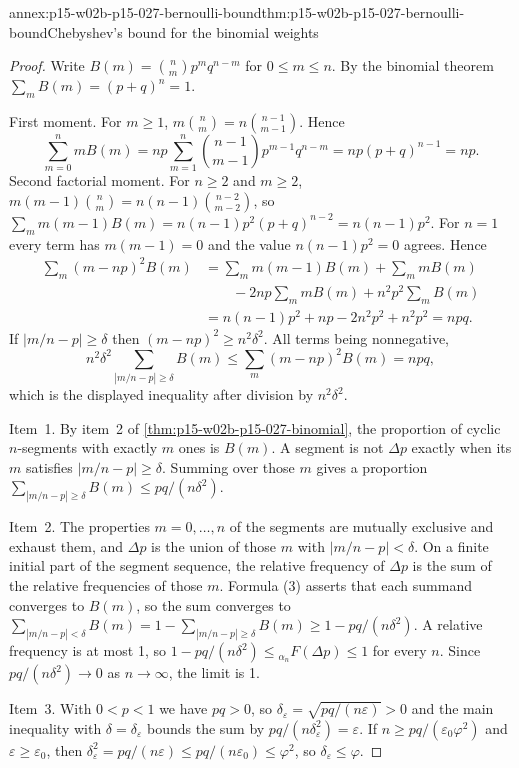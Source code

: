 \begin{annexitem}{annex:p15-w02b-p15-027-bernoulli-bound}{thm:p15-w02b-p15-027-bernoulli-bound}{Chebyshev's bound for the binomial weights}
\begin{proof}
Write \(B(m)=\binom nm p^mq^{n-m}\) for \(0\leq m\leq n\). By the binomial
theorem \(\sum_mB(m)=(p+q)^n=1\).

First moment. For \(m\geq1\),
\(m\binom nm=n\binom{n-1}{m-1}\). Hence
\[
 \sum_{m=0}^nmB(m)=np\sum_{m=1}^{n}\binom{n-1}{m-1}p^{m-1}q^{n-m}
 =np(p+q)^{n-1}=np.
\]
Second factorial moment. For \(n\geq2\) and \(m\geq2\),
\(m(m-1)\binom nm=n(n-1)\binom{n-2}{m-2}\), so
\(\sum_mm(m-1)B(m)=n(n-1)p^2(p+q)^{n-2}=n(n-1)p^2\). For \(n=1\) every
term has \(m(m-1)=0\) and the value \(n(n-1)p^2=0\) agrees.
Hence
\[
\begin{aligned}
 \sum_m(m-np)^2B(m)
 &=\sum_m m(m-1)B(m)+\sum_m mB(m)\\
 &\qquad-2np\sum_m mB(m)+n^2p^2\sum_mB(m)\\
 &=n(n-1)p^2+np-2n^2p^2+n^2p^2=npq.
\end{aligned}
\]
If \(|m/n-p|\geq\delta\) then \((m-np)^2\geq n^2\delta^2\). All terms
being nonnegative,
\[
 n^2\delta^2\sum_{|m/n-p|\geq\delta}B(m)\leq\sum_m(m-np)^2B(m)=npq ,
\]
which is the displayed inequality after division by \(n^2\delta^2\).

Item~1. By item~2 of \cref{thm:p15-w02b-p15-027-binomial}, the
proportion of cyclic \(n\)-segments with exactly \(m\) ones is \(B(m)\).
A segment is not \(\Delta p\) exactly when its \(m\) satisfies
\(|m/n-p|\geq\delta\). Summing over those \(m\) gives a proportion
\(\sum_{|m/n-p|\geq\delta}B(m)\leq pq/(n\delta^2)\).

Item~2. The properties \(m=0,\ldots,n\) of the segments are mutually
exclusive and exhaust them, and \(\Delta p\) is the union of those
\(m\) with \(|m/n-p|<\delta\). On a finite initial part of the segment
sequence, the relative frequency of \(\Delta p\) is the sum of the
relative frequencies of those \(m\). Formula (3) asserts that each
summand converges to \(B(m)\), so the sum converges to
\(\sum_{|m/n-p|<\delta}B(m)=1-\sum_{|m/n-p|\geq\delta}B(m)\geq1-pq/(n\delta^2)\).
A relative frequency is at most 1, so
\(1-pq/(n\delta^2)\leq{}_{\alpha_n}F(\Delta p)\leq1\) for every \(n\).
Since \(pq/(n\delta^2)\to0\) as \(n\to\infty\), the limit is 1.

Item~3. With \(0<p<1\) we have \(pq>0\), so
\(\delta_\varepsilon=\sqrt{pq/(n\varepsilon)}>0\) and the main inequality
with \(\delta=\delta_\varepsilon\) bounds the sum by
\(pq/(n\delta_\varepsilon^2)=\varepsilon\). If
\(n\geq pq/(\varepsilon_0\varphi^2)\) and \(\varepsilon\geq\varepsilon_0\),
then \(\delta_\varepsilon^2=pq/(n\varepsilon)\leq pq/(n\varepsilon_0)\leq\varphi^2\),
so \(\delta_\varepsilon\leq\varphi\).
\end{proof}
\end{annexitem}

